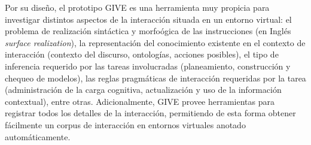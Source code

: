 
Por su dise\~no, el prototipo GIVE es una herramienta muy propicia para investigar distintos aspectos de la interacci\'on situada en un entorno virtual:
el problema de realizaci\'on sint\'actica y morfo\'ogica de las
instrucciones (en Ingl\'es \emph{surface realization}),
la representaci\'on del conocimiento existente en el contexto de
interacci\'on (contexto del discurso, ontolog\'ias, acciones posibles),
el tipo de inferencia requerido por las tareas involucradas
(planeamiento, construcci\'on y chequeo de modelos),
las reglas pragm\'aticas de interacci\'on requeridas por la tarea
(administraci\'on de la carga cognitiva, actualizaci\'on y uso de la informaci\'on contextual), entre otras. Adicionalmente, GIVE provee herramientas para registrar todos los detalles de la
interacci\'on, permitiendo de esta forma obtener f\'acilmente un corpus de interacci\'on en entornos virtuales anotado autom\'aticamente. 





